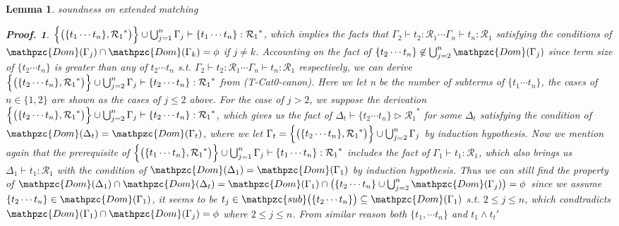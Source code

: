 \documentclass[12pt]{article}
\newtheorem{Lemma}{Lemma}[section]
\newtheorem{Proof}{Proof.}
\begin{document}
\begin{Lemma}{soundness on extended matching}
\begin{Proof}
    $\Bigl\{\bigl(\{t_1 \cdots t_n\}, {\mathcal{R}_1}^* \bigr) \Bigr\} \cup
    \bigcup_{j=1}^n\Gamma_j \vdash \{t_1 \cdots t_n\}: {\mathcal{R}_1}^*$,
    which implies the facts that
    $\Gamma_2 \vdash t_2 : \mathcal{R}_1 \cdots
    \Gamma_n \vdash t_n: \mathcal{R}_1$ satisfying the conditions of
    $\mathpzc{Dom}(\Gamma_j) \cap \mathpzc{Dom}(\Gamma_k) = \phi$ if
    $j \neq k$. Accounting on the fact of
    $\{t_2 \cdots t_n\} \not\in \bigcup_{j=2}^n\mathpzc{Dom}(\Gamma_j)$
    since term size of $\{t_2 \cdots t_n\}$ is greater than any of
    $t_2 \cdots t_n$ s.t. $\Gamma_2 \vdash t_2: \mathcal{R}_1 \cdots
    \Gamma_n \vdash t_n: \mathcal{R}_1$ respectively, we can derive
    $\Bigl\{\bigl(\{t_2 \cdots t_n\}, {\mathcal{R}_1}^* \bigr) \Bigr\} \cup
    \bigcup_{j=2}^n\Gamma_j \vdash \{t_2 \cdots t_n\}: {\mathcal{R}_1}^*$
    from (T-Cat0-canon). Here we let n be the number of subterms of
    $\{t_1 \cdots t_n\}$, the cases of $n \in \{1, 2\}$ are shown as the
    cases of $j \le 2$ above.
    For the case of $j > 2$, we suppose the derivation
    $\Bigl\{\bigl(\{t_2 \cdots t_n\}, {\mathcal{R}_1}^* \bigr) \Bigr\} \cup
    \bigcup_{j=2}^n\Gamma_j \vdash \{t_2 \cdots t_n\}: {\mathcal{R}_1}^*$,
    which gives us the fact of
    $\Delta_t \vdash \{t_2 \cdots t_n\} \triangleright {\mathcal{R}_1}^*$
    for some $\Delta_t$ satisfying the condition of
    $\mathpzc{Dom}(\Delta_t) = \mathpzc{Dom}(\Gamma_t)$, where we let
    $\Gamma_t = \Bigl\{\bigl(\{t_2 \cdots t_n\}, {\mathcal{R}_1}^* \bigr)
    \Bigr\} \cup \bigcup_{j=2}^n\Gamma_j$ by induction hypothesis. Now
    we mention again that the prerequisite of
    $\Bigl\{\bigl(\{t_1 \cdots t_n\}, {\mathcal{R}_1}^* \bigr) \Bigr\} \cup
    \bigcup_{j=1}^n\Gamma_j  \vdash \{t_1 \cdots t_n\}: {\mathcal{R}_1}^*$
    includes the fact of $\Gamma_1 \vdash t_1 : \mathcal{R}_1$, 
    which also brings us $\Delta_1 \vdash t_1 : \mathcal{R}_1$ with
    the condition of
    $\mathpzc{Dom}(\Delta_1) = \mathpzc{Dom}(\Gamma_1)$ by
    induction hypothesis. Thus we can still find the property of
    $\mathpzc{Dom}(\Delta_1) \cap \mathpzc{Dom}(\Delta_t) =
    \mathpzc{Dom}(\Gamma_1) \cap
    \bigl(\{t_2 \cdots t_n\} \cup \bigcup_{j=2}^n\mathpzc{Dom}(\Gamma_j)
    \bigr) = \phi$ since we assume
    $\{t_2 \cdots t_n\} \in \mathpzc{Dom}(\Gamma_1)$, it seems to be
    $t_j \in \mathpzc{sub}\bigl(\{t_2 \cdots t_n\} \bigr) \subseteq
    \mathpzc{Dom}(\Gamma_1)$ s.t. $2 \le j \le n$, which condtradicts
    $\mathpzc{Dom}(\Gamma_1) \cap \mathpzc{Dom}(\Gamma_j) = \phi$ where
    $2 \le j \le n$.
    From similar reason both $\{t_1, \cdots t_n\}$ and $t_1 \wedge t_t'$

\end{Proof}
\end{Lemma}
\end{document}
